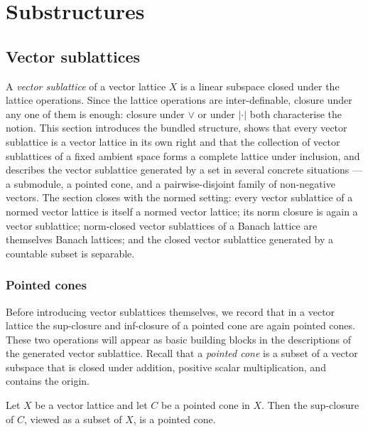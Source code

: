 \chapter{Substructures}

\section{Vector sublattices}

A \emph{vector sublattice} of a vector lattice $X$ is a linear subspace
closed under the lattice operations. Since the lattice operations are
inter-definable, closure under any one of them is enough: closure under
$\vee$ or under $\lvert \cdot \rvert$ both characterise the notion. This
section introduces the bundled structure, shows that every vector
sublattice is a vector lattice in its own right and that the collection
of vector sublattices of a fixed ambient space forms a complete lattice
under inclusion, and describes the vector sublattice generated by a set
in several concrete situations — a submodule, a pointed cone, and a
pairwise-disjoint family of non-negative vectors. The section closes
with the normed setting: every vector sublattice of a normed vector
lattice is itself a normed vector lattice; its norm closure is again a
vector sublattice; norm-closed vector sublattices of a Banach lattice
are themselves Banach lattices; and the closed vector sublattice
generated by a countable subset is separable.

\subsection{Pointed cones}

Before introducing vector sublattices themselves, we record that in a
vector lattice the sup-closure and inf-closure of a pointed cone are
again pointed cones. These two operations will appear as basic building
blocks in the descriptions of the generated vector sublattice. Recall
that a \emph{pointed cone} is a subset of a vector subspace that is
closed under addition, positive scalar multiplication, and contains
the origin.

\begin{lemma}
\label{lem:pointedCone-supClosure}
\leanok
{}
Let $X$ be a vector lattice and let $C$ be a pointed cone in $X$. Then
the sup-closure of $C$, viewed as a subset of $X$, is a pointed cone.
\end{lemma}

